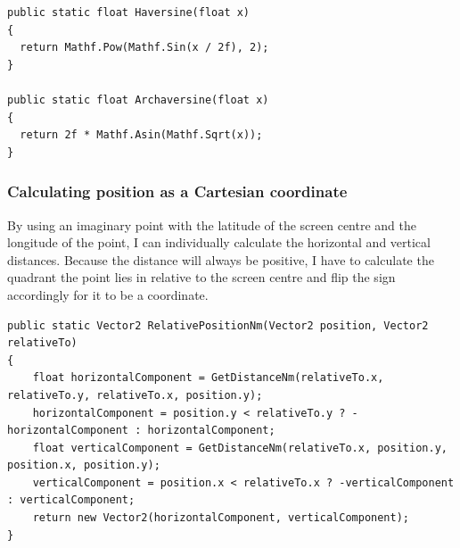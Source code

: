 \documentclass{article}
\begin{document}
\begin{lstlisting}[label={lst:haversine},caption=The haversine functions]
public static float Haversine(float x)
{
  return Mathf.Pow(Mathf.Sin(x / 2f), 2);
}

public static float Archaversine(float x)
{
  return 2f * Mathf.Asin(Mathf.Sqrt(x));
}
\end{lstlisting}

\subsubsection{Calculating position as a Cartesian coordinate}
By using an imaginary point with the latitude of the screen centre and the longitude of the point, I can individually calculate the horizontal and vertical distances.
Because the distance will always be positive, I have to calculate the \gls{quadrant} the point lies in relative to the screen centre and flip the sign accordingly for it to be a coordinate.
\lstset{style=csharp}
\begin{lstlisting}[caption=Calculating the position of a point relative to another]
public static Vector2 RelativePositionNm(Vector2 position, Vector2 relativeTo)
{
    float horizontalComponent = GetDistanceNm(relativeTo.x, relativeTo.y, relativeTo.x, position.y);
    horizontalComponent = position.y < relativeTo.y ? -horizontalComponent : horizontalComponent;
    float verticalComponent = GetDistanceNm(relativeTo.x, position.y, position.x, position.y);
    verticalComponent = position.x < relativeTo.x ? -verticalComponent : verticalComponent;
    return new Vector2(horizontalComponent, verticalComponent);
}
\end{lstlisting}
\end{document}
